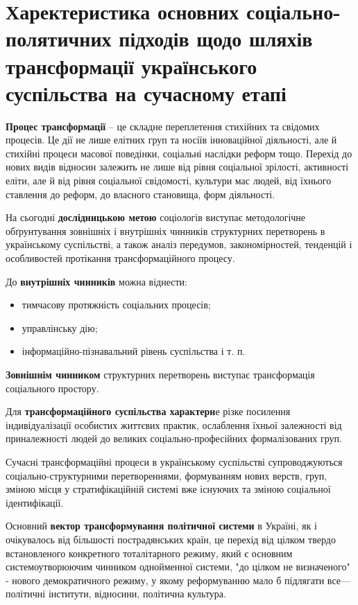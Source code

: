 \section{Харектеристика основних соціально-полятичних підходів щодо шляхів трансформації українського суспільства на сучасному етапі} 
\textbf{Процес трансформації} – це складне переплетення стихійних та свідомих процесів. Це дії не лише елітних груп та носіїв інноваційної діяльності, але й стихійні процеси масової поведінки, соціальні наслідки реформ тощо. Перехід до нових видів відносин залежить не лише від рівня соціальної зрілості, активності еліти, але й від рівня соціальної свідомості, культури мас людей, від їхнього ставлення до реформ, до власного становища, форм діяльності.

На сьогодні \textbf{дослідницькою метою} соціологів виступає методологічне обґрунтування зовнішніх і внутрішніх чинників структурних перетворень в українському суспільстві, а також аналіз передумов, закономірностей, тенденцій і особливостей протікання трансформаційного процесу.

До \textbf{внутрішніх чинників} можна віднести:
\begin{itemize}
\item тимчасову протяжність соціальних процесів;
\item управлінську дію;
\item інформаційно-пізнавальний рівень суспільства і т. п. 
\end{itemize}

\textbf{Зовнішнім чинником} структурних перетворень виступає трансформація соціального простору. 

Для \textbf{трансформаційного суспільства характерн}е різке посилення індивідуалізації особистих життєвих практик, ослаблення їхньої залежності від приналежності людей до великих соціально-професійних формалізованих груп. 

Сучасні трансформаційні процеси в українському суспільстві супроводжуються соціально-структурними перетвореннями, формуванням нових верств, груп, зміною місця у стратифікаційній системі вже існуючих та зміною соціальної ідентифікації.

Основний \textbf{вектор трансформування політичної системи} в Україні, як і очікувалось від більшості пострадянських країн, це перехід від цілком твердо встановленого конкретного тоталітарного режиму, який є основним системоутворюючим чинником однойменної системи, "до цілком не визначеного" - нового демократичного режиму, у якому реформуванню мало б підлягати все—політичні інститути, відносини, політична культура.

